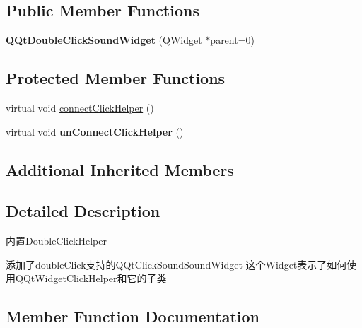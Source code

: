 \subsection*{Public Member Functions}
\begin{DoxyCompactItemize}
\item 
\mbox{\label{class_q_qt_double_click_sound_widget_aa4ec59e7443a5d5a22c236d34c07c548}} 
{\bfseries Q\+Qt\+Double\+Click\+Sound\+Widget} (Q\+Widget $\ast$parent=0)
\end{DoxyCompactItemize}
\subsection*{Protected Member Functions}
\begin{DoxyCompactItemize}
\item 
virtual void \mbox{\hyperlink{class_q_qt_double_click_sound_widget_a96be7b2c78a6454f37cf585a18dbd0d9}{connect\+Click\+Helper}} ()
\item 
\mbox{\label{class_q_qt_double_click_sound_widget_a0972516925df696459462e3ebc523760}} 
virtual void {\bfseries un\+Connect\+Click\+Helper} ()
\end{DoxyCompactItemize}
\subsection*{Additional Inherited Members}


\subsection{Detailed Description}
内置\+Double\+Click\+Helper

添加了double\+Click支持的\+Q\+Qt\+Click\+Sound\+Sound\+Widget 这个\+Widget表示了如何使用\+Q\+Qt\+Widget\+Click\+Helper和它的子类 

\subsection{Member Function Documentation}
\mbox{\label{class_q_qt_double_click_sound_widget_afaad4ed72c009df7ea612c0bec8e2f7d}} 
